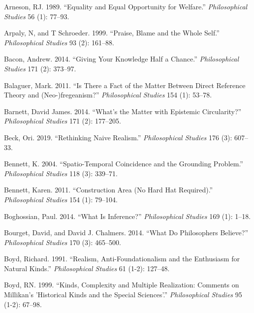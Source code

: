 \documentclass[
  10pt,
  letterpaper,
  DIV=11,
  numbers=noendperiod,
  twoside]{scrartcl}
\newlength{\cslhangindent}
\newenvironment{CSLReferences}[2] %
 {\begin{list}{}{%
  \setlength{\itemindent}{0pt}
  \setlength{\leftmargin}{0pt}
  \setlength{\parsep}{0pt}
  \ifodd #1
   \setlength{\leftmargin}{\cslhangindent}
   \setlength{\itemindent}{-1\cslhangindent}
  \fi
  \setlength{\itemsep}{#2\baselineskip}}}
 {\end{list}}
\begin{document}
\label{refs}
\begin{CSLReferences}{1}{0}
Arneson, RJ. 1989. {``Equality and Equal Opportunity for Welfare.''}
\emph{Philosophical Studies} 56 (1): 77--93.

Arpaly, N, and T Schroeder. 1999. {``Praise, Blame and the Whole
Self.''} \emph{Philosophical Studies} 93 (2): 161--88.

Bacon, Andrew. 2014. {``Giving Your Knowledge Half a Chance.''}
\emph{Philosophical Studies} 171 (2): 373--97.

Balaguer, Mark. 2011. {``Is There a Fact of the Matter Between Direct
Reference Theory and (Neo-)fregeanism?''} \emph{Philosophical Studies}
154 (1): 53--78.

Barnett, David James. 2014. {``What's the Matter with Epistemic
Circularity?''} \emph{Philosophical Studies} 171 (2): 177--205.

Beck, Ori. 2019. {``Rethinking Naive Realism.''} \emph{Philosophical
Studies} 176 (3): 607--33.

Bennett, K. 2004. {``Spatio-Temporal Coincidence and the Grounding
Problem.''} \emph{Philosophical Studies} 118 (3): 339--71.

Bennett, Karen. 2011. {``Construction Area (No Hard Hat Required).''}
\emph{Philosophical Studies} 154 (1): 79--104.

Boghossian, Paul. 2014. {``What Is Inference?''} \emph{Philosophical
Studies} 169 (1): 1--18.

Bourget, David, and David J. Chalmers. 2014. {``What Do Philosophers
Believe?''} \emph{Philosophical Studies} 170 (3): 465--500.

Boyd, Richard. 1991. {``Realism, Anti-Foundationalism and the Enthusiasm
for Natural Kinds.''} \emph{Philosophical Studies} 61 (1-2): 127--48.

Boyd, RN. 1999. {``Kinds, Complexity and Multiple Realization: Comments
on Millikan's 'Historical Kinds and the Special Sciences'.''}
\emph{Philosophical Studies} 95 (1-2): 67--98.


\end{CSLReferences}
\end{document}
